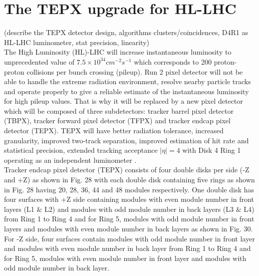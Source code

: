  \section{The TEPX upgrade for HL-LHC}
\label{sec:tepx}
(describe the TEPX detector design, algorithms clusters/coincidences, D4R1 as HL-LHC luminometer, stat precision, linearity)\\

The High Luminosity (HL)-LHC will increase instantaneous luminosity to unprecedented value of $7.5 \times 10^{34} cm^{-2} s^{-1}$ which corresponds to 200 proton-proton collisions per bunch crossing (pileup). Run 2 pixel detector will not be able to handle the extreme radiation environment, resolve nearby particle tracks and operate properly to give a reliable estimate of the instantaneous luminosity for high pileup values. That is why it will be replaced by a new pixel detector which will be composed of three subdetectors: tracker barrel pixel detector (TBPX), tracker forward pixel detector (TFPX) and tracker endcap pixel detector (TEPX). TEPX will have better radiation tolerance, increased granularity, improved two-track separation, improved estimation of hit rate and statistical precision, extended tracking acceptance $|\eta|=4$ with Disk 4 Ring 1 operating as an independent luminometer \cite{Klein:2017nke}. \\

Tracker endcap pixel detector (TEPX) consists of four double disks per side (-Z and +Z) as shown in Fig. 28 with each double disk containing five rings as shown in Fig. 28 having 20, 28, 36, 44 and 48 modules respectively. One double disk has four surfaces with +Z side containing modules with even module number in front layers (L1 $\&$ L2) and modules with odd module number in back layers (L3 $\&$ L4) from Ring 1 to Ring 4 and for Ring 5, modules with odd module number in front layers and modules with even module number in back layers as shown in Fig. 30. For -Z side, four surfaces contain modules with odd module number in front layer and modules with even module number in back layer from Ring 1 to Ring 4 and for Ring 5, modules with even module number in front layer and modules with odd module number in back layer. \\


